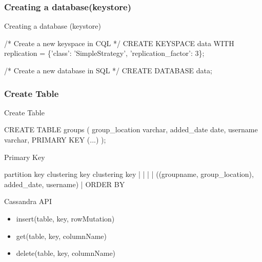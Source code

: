 \documentclass[
  10pt
]{beamer}
\begin{document}
\subsubsection{Creating a database(keystore)}
\begin{frame}[fragile]{Creating a database (keystore) \cite{cqlAlexMeng}} %
  \begin{semiverbatim}
/* Create a new keyspace in CQL */
CREATE KEYSPACE data WITH replication =
\{'class': 'SimpleStrategy', 'replication_factor': 3\};

/* Create a new database in SQL */
CREATE DATABASE data;
  \end{semiverbatim}
\end{frame}

\subsubsection{Create Table}

\begin{frame}[fragile]{Create Table \cite{cqlAlexMeng, newInCQL3}}
  \begin{semiverbatim}
CREATE TABLE groups (
   group_location varchar,
   added_date date,
   username varchar,
   PRIMARY KEY (...)
);
  \end{semiverbatim}
\end{frame}

\begin{frame}[fragile]{Primary Key \cite{cqlPrimaryKeyDefinition}}
  \begin{semiverbatim}
      partition key       clustering key  clustering key
       |       |                |            |
((groupname, group_location), added_date, username)
                                |
                            ORDER BY
  \end{semiverbatim}
\end{frame}

\begin{frame}{Cassandra API \cite{cassandra_paper}}
  \begin{itemize}
    \item insert(table, key, rowMutation) \\
    \item get(table, key, columnName) \\
    \item delete(table, key, columnName) \\
  \end{itemize}
\end{frame}
\end{document}
